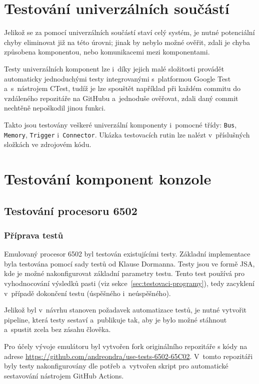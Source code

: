 \section{Testování univerzálních součástí}
Jelikož se za pomocí univerzálních součástí staví celý systém, je nutné potenciální chyby eliminovat již na této úrovni; jinak by nebylo možné ověřit, zdali je chyba způsobena komponentou, nebo komunikacemi mezi komponentami.

Testy univerzálních komponent lze i~díky jejich malé složitosti provádět automaticky jednoduchými testy integrovanými s~platformou Google Test a~s~nástrojem CTest, tudíž je lze spouštět například při každém commitu do vzdáleného repozitáře na GitHubu a~jednoduše ověřovat, zdali daný commit nechtěně nepoškodil jinou funkci.

Takto jsou testovány veškeré univerzální komponenty i~pomocné třídy: \texttt{Bus}, \texttt{Memory}, \texttt{Trigger} i~\texttt{Connector}. Ukázka testovacích rutin lze nalézt v~příslušných složkách ve zdrojovém kódu.

\section{Testování komponent konzole}
\subsection{Testování procesoru 6502}
\label{sec:test-procesor}
\subsubsection{Příprava testů}
Emulovaný procesor 6502 byl testován existujícími testy. Základní implementace byla testována pomocí sady testů od Klause Dormanna. Testy jsou ve formě JSA, kde je možné nakonfigurovat základní parametry testu. Tento test používá pro vyhodnocování výsledků pasti (viz sekce~\ref{sec:testovaci-programy}), tedy zacyklení v~případě dokončení testu (úspěšného i~neúspěšného).

Jelikož byl v~návrhu stanoven požadavek automatizace testů, je nutné vytvořit pipeline, která testy sestaví a~publikuje tak, aby je bylo možné stáhnout a~spustit zcela bez zásahu člověka.

Pro účely vývoje emulátoru byl vytvořen fork originálního repozitáře s kódy na adrese \url{https://github.com/andreondra/use-tests-6502-65C02}. V~tomto repozitáři byly testy nakonfigurovány dle potřeb a~vytvořen skript pro automatické sestavování nástrojem GitHub Actions.

